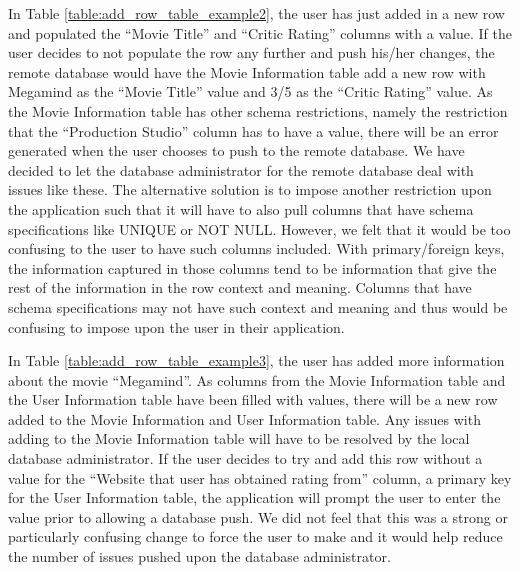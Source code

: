 \documentclass[12pt]{article}
\begin{document}
In Table \ref{table:add_row_table_example2}, the user has just added in a new row and populated the ``Movie Title'' and ``Critic Rating'' columns with a value. If the user decides to not populate the row any further and push his/her changes, the remote database would have the Movie Information table add a new row with Megamind as the ``Movie Title'' value and 3/5 as the ``Critic Rating'' value. As the Movie Information table has other schema restrictions, namely the restriction that the ``Production Studio'' column has to have a value, there will be an error generated when the user chooses to push to the remote database. We have decided to let the database administrator for the remote database deal with issues like these. The alternative solution is to impose another restriction upon the application such that it will have to also pull columns that have schema specifications like UNIQUE or NOT NULL. However, we felt that it would be too confusing to the user to have such columns included. With primary/foreign keys, the information captured in those columns tend to be information that give the rest of the information in the row context and meaning. Columns that have schema specifications may not have such context and meaning and thus would be confusing to impose upon the user in their application.

In Table \ref{table:add_row_table_example3}, the user has added more information about the movie ``Megamind''. As columns from the Movie Information table and the User Information table have been filled with values, there will be a new row added to the Movie Information and User Information table. Any issues with adding to the Movie Information table will have to be resolved by the local database administrator. If the user decides to try and add this row without a value for the ``Website that user has obtained rating from'' column, a primary key for the User Information table, the application will prompt the user to enter the value prior to allowing a database push. We did not feel that this was a strong or particularly confusing change to force the user to make and it would help reduce the number of issues pushed upon the database administrator.
\end{document}
